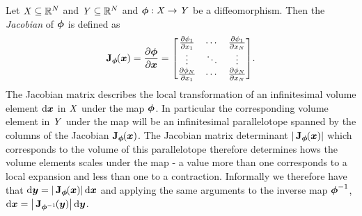 Let $\mathit{X} \subseteq \mathbb{R}^N$ and $\mathit{Y} \subseteq \mathbb{R}^N$ and $\boldsymbol{\phi} : \mathit{X} \to \mathit{Y}$ be a diffeomorphism. Then the \emph{Jacobian} of $\boldsymbol{\phi}$ is defined as
\begin{equation}
  \jacob{\vct{\phi}}{\vct{x}} = \pd{\vct{\phi}}{\vct{x}} =
  \begin{bmatrix}
    \pd{\phi_1}{x_1} & \cdots & \pd{\phi_1}{x_N}\\
    \vdots & \ddots & \vdots \\
    \pd{\phi_N}{x_1} & \cdots & \pd{\phi_N}{x_N}
  \end{bmatrix}.
\end{equation}
The Jacobian matrix describes the local transformation of an infinitesimal volume element $\mathrm{d}\boldsymbol{x}$ in $\mathit{X}$ under the map $\boldsymbol{\phi}$. In particular the corresponding volume element in $\mathit{Y}$ under the map will be an infinitesimal parallelotope spanned by the columns of the Jacobian $\jacob{\vct{\phi}}{\vct{x}}$. The Jacobian matrix determinant $\left|\,\jacob{\vct{\phi}}{\vct{x}}\right|$ which corresponds to the volume of this parallelotope therefore determines hows the volume elements scales under the map - a value more than one corresponds to a local expansion and less than one to a contraction. Informally we therefore have that $\dr\vct{y} = \left|\,\jacob{\vct{\phi}}{\vct{x}}\right|\,\dr\vct{x}$ and applying the same arguments to the inverse map $\boldsymbol{\phi}^{-1}$, $\dr\vct{x} = \left|\,\jacob{\vct{\phi}^{-1}}{\vct{y}}\right|\,\dr\vct{y}$.

